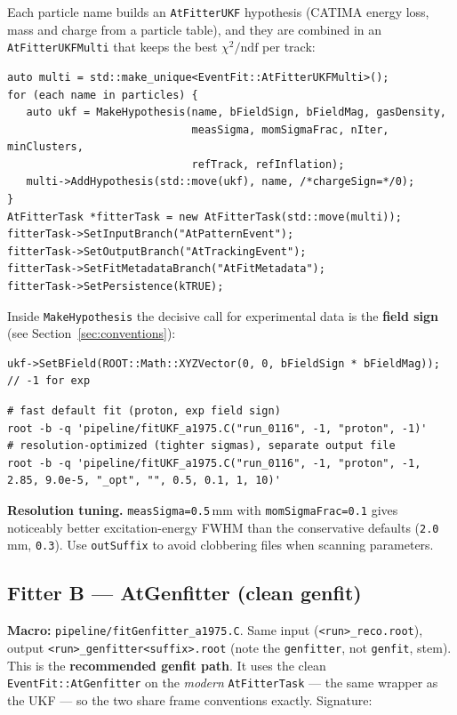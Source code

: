 \documentclass[11pt,a4paper]{article}
\newcommand{\code}[1]{\texttt{\small #1}}
\newcommand{\file}[1]{\texttt{\small #1}}
\begin{document}
Each particle name builds an \code{AtFitterUKF} hypothesis (CATIMA energy loss,
mass and charge from a particle table), and they are combined in an
\code{AtFitterUKFMulti} that keeps the best $\chi^2/\mathrm{ndf}$ per track:

\begin{lstlisting}
auto multi = std::make_unique<EventFit::AtFitterUKFMulti>();
for (each name in particles) {
   auto ukf = MakeHypothesis(name, bFieldSign, bFieldMag, gasDensity,
                             measSigma, momSigmaFrac, nIter, minClusters,
                             refTrack, refInflation);
   multi->AddHypothesis(std::move(ukf), name, /*chargeSign=*/0);
}
AtFitterTask *fitterTask = new AtFitterTask(std::move(multi));
fitterTask->SetInputBranch("AtPatternEvent");
fitterTask->SetOutputBranch("AtTrackingEvent");
fitterTask->SetFitMetadataBranch("AtFitMetadata");
fitterTask->SetPersistence(kTRUE);
\end{lstlisting}

Inside \code{MakeHypothesis} the decisive call for experimental data is the
\textbf{field sign} (see Section~\ref{sec:conventions}):

\begin{lstlisting}
ukf->SetBField(ROOT::Math::XYZVector(0, 0, bFieldSign * bFieldMag)); // -1 for exp
\end{lstlisting}

\begin{lstlisting}[style=bash]
# fast default fit (proton, exp field sign)
root -b -q 'pipeline/fitUKF_a1975.C("run_0116", -1, "proton", -1)'
# resolution-optimized (tighter sigmas), separate output file
root -b -q 'pipeline/fitUKF_a1975.C("run_0116", -1, "proton", -1, 2.85, 9.0e-5, "_opt", "", 0.5, 0.1, 1, 10)'
\end{lstlisting}

\begin{notebox}
\textbf{Resolution tuning.} \code{measSigma=0.5}\,mm with \code{momSigmaFrac=0.1}
gives noticeably better excitation-energy FWHM than the conservative defaults
(\code{2.0}\,mm, \code{0.3}). Use \code{outSuffix} to avoid clobbering files when
scanning parameters.
\end{notebox}

\subsection{Fitter B --- AtGenfitter (clean genfit)}\label{sec:fitgenfitter}

\textbf{Macro:} \file{pipeline/\allowbreak fitGenfitter\_a1975.C}. Same input
(\file{<run>\_reco.root}), output \file{<run>\_genfitter<suffix>.root} (note the
\code{genfitter}, not \code{genfit}, stem). This is the \textbf{recommended genfit
path}. It uses the clean \code{EventFit::\allowbreak AtGenfitter} on the \emph{modern}
\code{AtFitterTask} --- the same wrapper as the UKF --- so the two share frame
conventions exactly. Signature:
\end{document}
